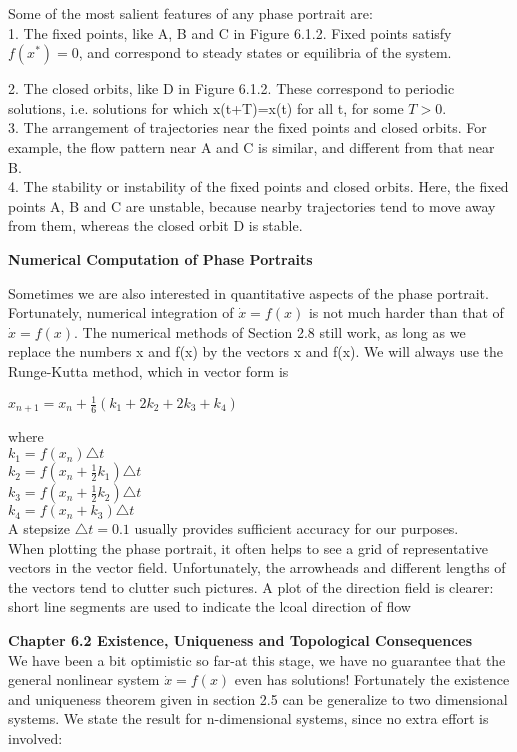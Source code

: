 \documentclass{article}
\newcommand\tab[1][1cm]{\hspace*{#1}}
\begin{document}
Some of the most salient features of any phase portrait are: \\
\tab 1. The fixed points, like A, B and C in Figure 6.1.2. Fixed points satisfy $f(x^{*})=0$, and correspond to steady states or equilibria of the system. \\ \tab

2. The closed orbits, like D in Figure 6.1.2. These correspond to periodic solutions, i.e. solutions for which x(t+T)=x(t) for all t, for some $T>0$. \\ \tab
3. The arrangement of trajectories near the fixed points and closed orbits. For example, the flow pattern near A and C is similar, and different from that near B. \\ \tab
4. The stability or instability of the fixed points and closed orbits. Here, the fixed points A, B and C are unstable, because nearby trajectories tend to move away from them, whereas the closed orbit D is stable. 

\textbf {Numerical Computation of Phase Portraits}

Sometimes we are also interested in quantitative aspects of the phase portrait. Fortunately, numerical integration of $\dot{x}=f(x)$ is not much harder than that of $\dot{x}=f(x)$. The numerical methods of Section 2.8 still work, as long as we replace the numbers x and f(x) by the vectors x and f(x). We will always use the Runge-Kutta method, which in vector form is
\begin{center}
$x_{n+1}=x_{n}+\frac{1}{6}(k_{1}+2k_{2}+2k_{3}+k_{4})$
\end{center}

where
\\ \tab
$k_{1}=f(x_{n})\triangle t$ \\ \tab
$k_{2}=f(x_{n}+\frac{1}{2}k_{1}) \triangle t$ \\ \tab
$k_{3}=f(x_{n}+\frac{1}{2}k_{2})\triangle t$ \\ \tab
$k_{4}=f(x_{n}+k_{3})\triangle t$ \\
A stepsize $\triangle t = 0.1$ usually provides sufficient accuracy for our purposes. \\ \tab
When plotting the phase portrait, it often helps to see a grid of representative vectors in the vector field. Unfortunately, the arrowheads and different lengths of the vectors tend to clutter such pictures. A plot of the direction field is clearer: short line segments are used to indicate the lcoal direction of flow

\textbf {Chapter 6.2 Existence, Uniqueness and Topological Consequences} \\ \tab
We have been a bit optimistic so far-at this stage, we have no guarantee that the general nonlinear system $\dot{x}=f(x)$ even has solutions! Fortunately the existence and uniqueness theorem given in section 2.5 can be generalize to two dimensional systems. We state the result for n-dimensional systems, since no extra effort is involved:
\end{document}
